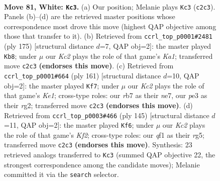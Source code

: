 \documentclass[11pt]{article}
\begin{document}
\clearpage

\begin{figure}[p]\centering
\begin{subfigure}{0.46\textwidth}\centering
\resizebox{\linewidth}{!}{%
\newchessgame
\chessboard[
  setfen={8/1r6/6k1/8/8/4p3/2K3p1/5q2 w - - 0 81},
  showmover=false,
  pgfstyle=straightmove, color=movearrow, markmove={c2-c3}
]}
\caption{}
\end{subfigure}\hfill
\begin{subfigure}{0.46\textwidth}\centering
\resizebox{\linewidth}{!}{%
\newchessgame
\chessboard[
  setfen={k5K1/3Q4/4P3/8/8/8/8/8 b - - 0 88},
  showmover=false,
  pgfstyle=straightmove, color=movearrow, markmove={a8-b8}
]}
\caption{}
\end{subfigure}
\\[4pt]
\begin{subfigure}{0.46\textwidth}\centering
\resizebox{\linewidth}{!}{%
\newchessgame
\chessboard[
  setfen={4k3/4N3/3Q4/2P5/8/2K5/6R1/8 b - - 0 81},
  showmover=false,
  pgfstyle=straightmove, color=movearrow, markmove={e8-f7}
]}
\caption{}
\end{subfigure}\hfill
\begin{subfigure}{0.46\textwidth}\centering
\resizebox{\linewidth}{!}{%
\newchessgame
\chessboard[
  setfen={8/5k2/8/6RP/5P2/3K4/8/4r3 b - - 48 73},
  showmover=false,
  pgfstyle=straightmove, color=movearrow, markmove={f7-f6}
]}
\caption{}
\end{subfigure}
\caption{\textbf{Move 81, White: \texttt{Kc3}.} (a) Our position; Melanie plays \texttt{Kc3} (\texttt{c2c3}). Panels (b)--(d) are the retrieved master positions whose correspondence most drove this move (highest QAP objective among those that transfer to it). (b) Retrieved from \texttt{ccrl\_top\_p0001\#2481} (ply 175) [structural distance $d$=7, QAP obj=2]: the master played \texttt{Kb8}; under $\mu$ our \emph{Kc2} plays the role of that game's \emph{Ka1}; transferred move \texttt{c2c3} \textbf{(endorses this move)}. (c) Retrieved from \texttt{ccrl\_top\_p0001\#664} (ply 161) [structural distance $d$=10, QAP obj=2]: the master played \texttt{Kf7}; under $\mu$ our \emph{Kc2} plays the role of that game's \emph{Ke1}; cross-type roles: our \emph{r}b7 as their \emph{n}e7, our \emph{p}e3 as their \emph{r}g2; transferred move \texttt{c2c3} \textbf{(endorses this move)}. (d) Retrieved from \texttt{ccrl\_top\_p0003\#466} (ply 145) [structural distance $d$=11, QAP obj=2]: the master played \texttt{Kf6}; under $\mu$ our \emph{Kc2} plays the role of that game's \emph{Kf2}; cross-type roles: our \emph{q}f1 as their \emph{r}g5; transferred move \texttt{c2c3} \textbf{(endorses this move)}. Synthesis: 23 retrieved analogs transferred to \texttt{Kc3} (summed QAP objective 22, the strongest correspondence among the candidate moves); Melanie committed it via the \texttt{search} selector.}
\label{fig:thought-m160}
\end{figure}
\end{document}
